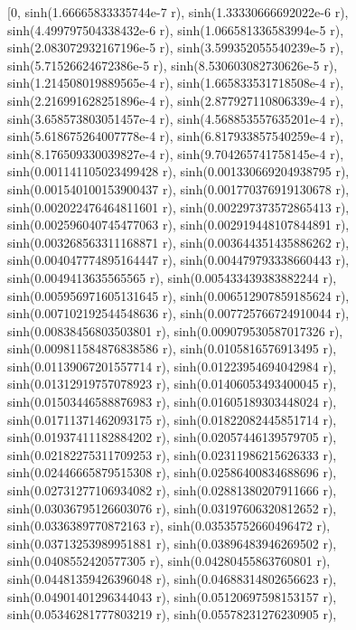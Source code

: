 \documentclass[a4paper,10pt]{article}
\begin{document}
\begin{eulernotebook}
\begin{eulercomment}
\begin{eulercomment}
\begin{eulercomment}
\begin{eulercomment}
\begin{eulercomment}
\begin{eulercomment}
\begin{eulercomment}
\begin{eulercomment}
\begin{eulercomment}
\begin{eulercomment}
\begin{eulercomment}
\begin{eulercomment}
\begin{eulercomment}
\begin{eulercomment}
\begin{eulercomment}
\begin{eulercomment}
\begin{eulercomment}
\begin{eulercomment}
\begin{eulercomment}
\begin{eulercomment}
\begin{eulercomment}
\begin{eulercomment}
\begin{eulercomment}
\begin{eulercomment}
\begin{eulercomment}
\begin{eulercomment}
\begin{eulercomment}
\begin{eulercomment}
\begin{euleroutput}
          [0, sinh(1.66665833335744e-7 r), sinh(1.33330666692022e-6 r), 
  sinh(4.499797504338432e-6 r), sinh(1.066581336583994e-5 r), 
  sinh(2.083072932167196e-5 r), sinh(3.599352055540239e-5 r), 
  sinh(5.71526624672386e-5 r), sinh(8.530603082730626e-5 r), 
  sinh(1.214508019889565e-4 r), sinh(1.665833531718508e-4 r), 
  sinh(2.216991628251896e-4 r), sinh(2.877927110806339e-4 r), 
  sinh(3.658573803051457e-4 r), sinh(4.568853557635201e-4 r), 
  sinh(5.618675264007778e-4 r), sinh(6.817933857540259e-4 r), 
  sinh(8.176509330039827e-4 r), sinh(9.704265741758145e-4 r), 
  sinh(0.001141105023499428 r), sinh(0.001330669204938795 r), 
  sinh(0.001540100153900437 r), sinh(0.001770376919130678 r), 
  sinh(0.002022476464811601 r), sinh(0.002297373572865413 r), 
  sinh(0.002596040745477063 r), sinh(0.002919448107844891 r), 
  sinh(0.003268563311168871 r), sinh(0.003644351435886262 r), 
  sinh(0.004047774895164447 r), sinh(0.004479793338660443 r), 
  sinh(0.0049413635565565 r), sinh(0.005433439383882244 r), 
  sinh(0.005956971605131645 r), sinh(0.006512907859185624 r), 
  sinh(0.007102192544548636 r), sinh(0.007725766724910044 r), 
  sinh(0.00838456803503801 r), sinh(0.009079530587017326 r), 
  sinh(0.009811584876838586 r), sinh(0.0105816576913495 r), 
  sinh(0.01139067201557714 r), sinh(0.01223954694042984 r), 
  sinh(0.01312919757078923 r), sinh(0.01406053493400045 r), 
  sinh(0.01503446588876983 r), sinh(0.01605189303448024 r), 
  sinh(0.01711371462093175 r), sinh(0.01822082445851714 r), 
  sinh(0.01937411182884202 r), sinh(0.02057446139579705 r), 
  sinh(0.02182275311709253 r), sinh(0.02311986215626333 r), 
  sinh(0.02446665879515308 r), sinh(0.02586400834688696 r), 
  sinh(0.02731277106934082 r), sinh(0.02881380207911666 r), 
  sinh(0.03036795126603076 r), sinh(0.03197606320812652 r), 
  sinh(0.0336389770872163 r), sinh(0.03535752660496472 r), 
  sinh(0.03713253989951881 r), sinh(0.03896483946269502 r), 
  sinh(0.0408552420577305 r), sinh(0.04280455863760801 r), 
  sinh(0.04481359426396048 r), sinh(0.04688314802656623 r), 
  sinh(0.04901401296344043 r), sinh(0.05120697598153157 r), 
  sinh(0.05346281777803219 r), sinh(0.05578231276230905 r), 

\end{euleroutput}
\end{eulercomment}
\end{eulercomment}
\end{eulercomment}
\end{eulercomment}
\end{eulercomment}
\end{eulercomment}
\end{eulercomment}
\end{eulercomment}
\end{eulercomment}
\end{eulercomment}
\end{eulercomment}
\end{eulercomment}
\end{eulercomment}
\end{eulercomment}
\end{eulercomment}
\end{eulercomment}
\end{eulercomment}
\end{eulercomment}
\end{eulercomment}
\end{eulercomment}
\end{eulercomment}
\end{eulercomment}
\end{eulercomment}
\end{eulercomment}
\end{eulercomment}
\end{eulercomment}
\end{eulercomment}
\end{eulercomment}
\end{eulernotebook}
\end{document}
